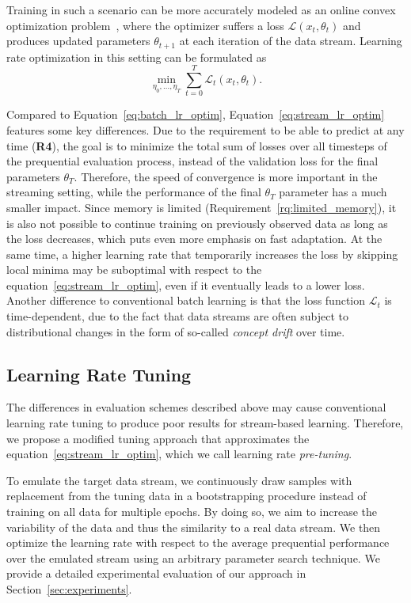 \documentclass[runningheads]{llncs}
\begin{document}
Training in such a scenario can be more accurately modeled as an online convex optimization problem~\cite{shalev-shwartzOnlineLearningOnline2011,hazanIntroductionOnlineConvex2016}, where the optimizer suffers a loss $\mathcal{L}(x_t, \theta_{t})$ and produces updated parameters $\theta_{t+1}$ at each iteration of the data stream.
Learning rate optimization in this setting can be formulated as
\begin{equation}
	\label{eq:stream_lr_optim}
	\min_{\eta_0, \ldots, \eta_T} \sum_{t=0}^{T} \mathcal{L}_t(x_t,\theta_t).
\end{equation}

Compared to Equation~\eqref{eq:batch_lr_optim}, Equation~\eqref{eq:stream_lr_optim} features some key differences.
Due to the requirement to be able to predict at any time (\textbf{R4}), the goal is to minimize the total sum of losses over all timesteps of the prequential evaluation process, instead of the validation loss for the final parameters $\theta_T$.
Therefore, the speed of convergence is more important in the streaming setting, while the performance of the final $\theta_T$ parameter has a much smaller impact.
Since memory is limited (Requirement~\ref{rq:limited_memory}), it is also not possible to continue training on previously observed data as long as the loss decreases, which puts even more emphasis on fast adaptation.
At the same time, a higher learning rate that temporarily increases the loss by skipping local minima may be suboptimal with respect to the equation~\eqref{eq:stream_lr_optim}, even if it eventually leads to a lower loss.
Another difference to conventional batch learning is that the loss function $\mathcal{L}_t$ is time-dependent, due to the fact that data streams are often subject to distributional changes in the form of so-called \textit{concept drift} over time.

\subsection{Learning Rate Tuning}\label{subsec:pre-tuning}

The differences in evaluation schemes described above may cause conventional learning rate tuning to produce poor results for stream-based learning.
Therefore, we propose a modified tuning approach that approximates the equation~\eqref{eq:stream_lr_optim}, which we call learning rate \textit{pre-tuning}.

To emulate the target data stream, we continuously draw samples with replacement from the tuning data in a bootstrapping procedure instead of training on all data for multiple epochs.
By doing so, we aim to increase the variability of the data and thus the similarity to a real data stream.
We then optimize the learning rate with respect to the average prequential performance over the emulated stream using an arbitrary parameter search technique.
We provide a detailed experimental evaluation of our approach in Section~\ref{sec:experiments}.
\end{document}

